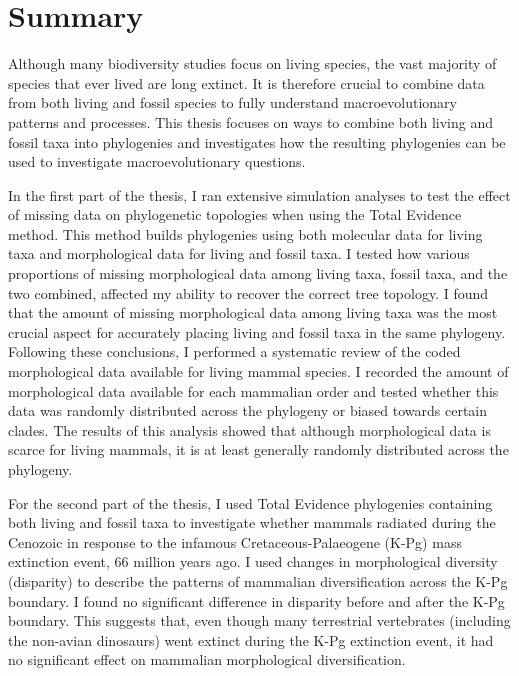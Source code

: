 \chapter*{Summary}


Although many biodiversity studies focus on living species, the vast majority of species that ever lived are long extinct.
It is therefore crucial to combine data from both living and fossil species to fully understand macroevolutionary %
patterns and processes.
This thesis focuses on ways to combine both living and fossil taxa into phylogenies and investigates how the resulting phylogenies can be used to investigate macroevolutionary questions.

In the first part of the thesis, I ran extensive simulation analyses to test the effect of missing data on phylogenetic topologies when using the Total Evidence method.
This method builds phylogenies using both molecular data for living taxa and morphological data for living and fossil taxa.
I tested how various proportions of missing morphological data among living taxa, fossil taxa, and the two combined, affected my ability to recover the correct tree topology.
I found that the amount of missing morphological data among living taxa was the most crucial aspect for accurately placing living and fossil taxa in the same phylogeny.
Following these conclusions, I performed a systematic review of the coded morphological data available for living mammal species.
I recorded the amount of morphological data available for each mammalian order and tested whether this data was randomly distributed across the phylogeny or biased towards certain clades.
The results of this analysis showed that although morphological data is scarce for living mammals, it is at least generally randomly distributed across the phylogeny. %

For the second part of the thesis, I used Total Evidence phylogenies containing both living and fossil taxa to investigate whether mammals radiated during the Cenozoic in response to the infamous Cretaceous-Palaeogene (K-Pg) mass extinction event, 66 million years ago.
I used changes in morphological diversity (disparity) to describe the patterns of mammalian diversification across the K-Pg boundary.
I found no significant difference in disparity before and after the K-Pg boundary.
This suggests that, even though many terrestrial vertebrates (including the non-avian dinosaurs) went extinct during the K-Pg extinction event, it had no significant effect on mammalian morphological diversification. %


